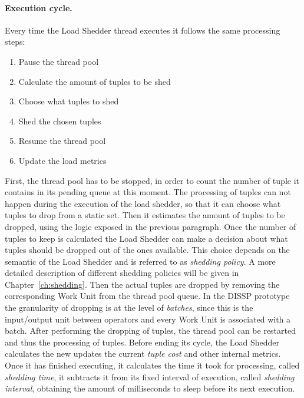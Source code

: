 \paragraph{Execution cycle.}
Every time the Load Shedder thread executes it follows the same processing steps:
\begin{environment}
\singlespacing
\begin{enumerate}
  \item Pause the thread pool
  \item Calculate the amount of tuples to be shed
  \item Choose what tuples to shed
  \item Shed the chosen tuples
  \item Resume the thread pool
  \item Update the load metrics 
\end{enumerate}
\end{environment}
First, the thread pool has to be stopped, in order to count the number of tuple it contains in its
pending queue at this moment. The processing of tuples can not happen during the execution of the load
shedder, so that it can choose what tuples to drop from a static set. Then it estimates the amount of
tuples to be dropped, using the logic exposed in the previous paragraph.
 Once the number of tuples to keep is calculated the Load Shedder can make a decision about
what tuples should be dropped out of the ones available. This choice depends on the semantic of the Load
Shedder and is referred to as \emph{shedding policy}. A more detailed description of different shedding
policies will be given in Chapter~\ref{ch:shedding}. Then the actual tuples are dropped by
removing the corresponding Work Unit from the thread pool queue. In the DISSP
prototype the granularity of dropping is at the level of \emph{batches}, since this is the input/output
unit between operators and every Work Unit is associated with a batch. After performing the dropping of
tuples, the thread pool can be restarted and thus the processing of tuples. Before ending its cycle, the
Load Shedder calculates the new updates the current \emph{tuple cost} and other internal metrics. Once it
has finished executing, it calculates the time it took for processing, called \emph{shedding time}, it
subtracts it from its fixed interval of execution, called \emph{shedding interval}, obtaining the amount
of milliseconds to sleep before its next execution.

